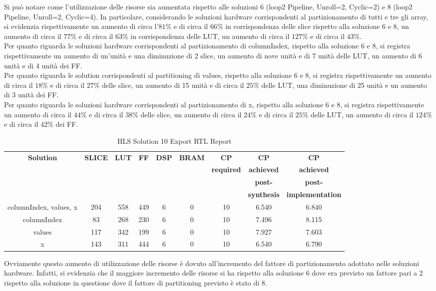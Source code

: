 Si può notare come l'utilizzazione delle risorse sia aumentata rispetto alle soluzioni 6 (loop2 Pipeline, Unroll=2, Cyclic=2) e 8 (loop2 Pipeline, Unroll=2, Cyclic=4). In particolare, considerando le soluzioni hardware corrispondenti al partizionamento di tutti e tre gli array, si evidenzia rispettivamente un aumento di circa l'$81\%$ e di circa il $66\%$ in corrispondenza delle slice rispetto alla soluzione 6 e 8, un aumento di circa il $77\%$ e di circa il $63\%$ in corrispondenza delle LUT, un aumento di circa il $127\%$ e di circa il $43\%$. 
\\
Per quanto riguarda le soluzioni hardware corrispondenti al partizionamento di columnIndex, rispetto alla soluzione 6 e 8, si registra rispettivamente un aumento di un'unità e una diminuzione di 2 slice, un aumento di nove unità e di 7 unità delle LUT, un aumento di 6 unità e di 4 unità dei FF. 
\\
Per quanto riguarda le solution corrispondenti al partitioning di values, rispetto alla soluzione 6 e 8, si registra rispettivamente un aumento di circa il $18\%$ e di circa il $27\%$ delle slice, un aumento di 15 unità e di circa il $25\%$ delle LUT, una diminuzione di 25 unità e un aumento di 3 unità dei FF. 
\\
Per quanto riguarda le soluzioni hardware corrispondenti al partizionamento di x, rispetto alla soluzione 6 e 8, si registra rispettivamente un aumento di circa il $44\%$ e di circa il $38\%$ delle slice, un aumento di circa il $24\%$ e di circa il $25\%$ delle LUT, un aumento di circa il $124\%$ e di circa il $42\%$ dei FF.

\begin{table}[H]
	\centering
	\begin{tabular}{|c|c|c|c|c|c|c|c|c|}
		\hline
		\textbf{Solution} & \textbf{SLICE} & \textbf{LUT} & \textbf{FF} & \textbf{DSP} & \textbf{BRAM} & \textbf{CP} & \textbf{CP} & \textbf{CP} \\
		& & & & & & \textbf{required} & \textbf{achieved} & \textbf{achieved}\\
		& & & & & & & \textbf{post-} & \textbf{post-}\\
		& & & & & & & \textbf{synthesis} & \textbf{implementation}\\
		\hline
		columnIndex, values, x  & 204 & 558 & 449 & 6 & 0 & 10 & 6.540 & 6.840 \\
		\hline
		columnIndex  & 83 & 268 & 230 & 6 & 0 & 10 & 7.496 & 8.115 \\
		\hline
		values  & 117 & 342 & 199 & 6 & 0 & 10 & 7.927 & 7.603 \\
		\hline
		x  & 143 & 311 & 444 & 6 & 0 & 10 & 6.540 & 6.790 \\
		\hline
	\end{tabular}
	\caption{HLS Solution 10 Export RTL Report}
	\label{tab:hls-solution-10-export-rtl-report}
\end{table}

Ovviamente questo aumento di utilizzazione delle risorse è dovuto all'incremento del fattore di partizionamento adottato nelle soluzioni hardware. Infatti, si evidenzia che il maggiore incremento delle risorse si ha rispetto alla soluzione 6 dove era previsto un fattore pari a 2 rispetto alla soluzione in questione dove il fattore di partitioning previsto è stato di 8.